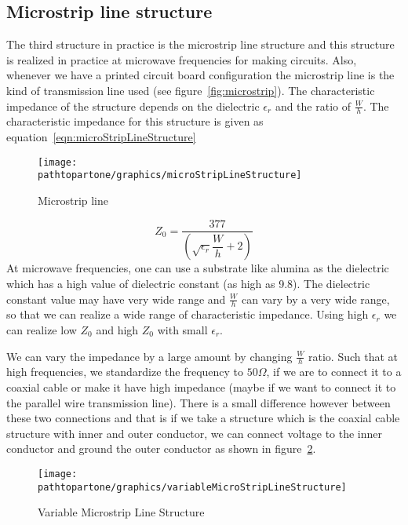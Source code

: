 \subsection{Microstrip line structure}
The third structure in practice is the microstrip line structure and this structure is realized in practice at microwave frequencies for making circuits. Also, whenever we have a printed circuit board configuration the microstrip line is the kind of transmission line used (see figure~\ref{fig:microstrip}). The characteristic impedance of the structure depends on the dielectric $\epsilon_{r}$ and the ratio of $\frac{W}{h}$. The characteristic impedance for this structure is given as equation~\ref{eqn:microStripLineStructure}
\begin{figure}[h]
\centering
\texttt{[image: \\pathtopartone/graphics/microStripLineStructure]}
\caption{Microstrip line}
\label{fig:microStripLineStructure}
\end{figure}

\begin{equation}
Z_0 =\dfrac{377}{\left(\sqrt{\epsilon_r}\dfrac{W}{h}+2\right)}
\label{eqn:microStripLineStructure}
\end{equation}
At microwave frequencies, one can use a substrate like alumina as the dielectric which has a high value of dielectric constant (as high as 9.8). The dielectric constant value may have very wide range and $\frac{W}{h}$ can vary by a very wide range, so that we can realize a wide range of characteristic impedance. Using high $\epsilon_r$ we can realize low $Z_0$ and high $Z_0$ with small $\epsilon_r$.

We can vary the impedance by a large amount by changing $\frac{W}{h}$ ratio. Such that at high frequencies, we standardize the frequency to $50\varOmega$, if we are to connect it to a coaxial cable or make it have high impedance (maybe if we want to connect it to the parallel wire transmission line). There is a small difference however between these two connections and that is if we take a structure which is the coaxial cable structure with inner and outer conductor, we can connect voltage to the inner conductor and ground the outer conductor as shown in figure~\ref{fig:microstripvar}.
\begin{figure}[h]
\centering
\texttt{[image: \\pathtopartone/graphics/variableMicroStripLineStructure]}
\caption{Variable Microstrip Line Structure}
\label{fig:microstripvar}
\end{figure}

